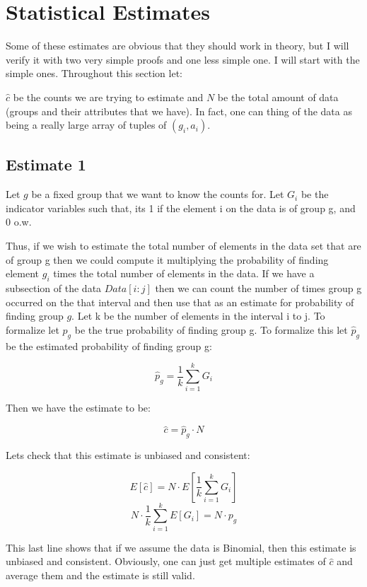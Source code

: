 \documentclass[a4paper]{article}
\begin{document}
\section{Statistical Estimates}

Some of these estimates are obvious that they should work in theory, but I will verify it with two very simple proofs and one less simple one.
I will start with the simple ones.
Throughout this section let:

$\hat{c}$ be the counts we are trying to estimate and $N$ be the total amount of data (groups and their attributes that we have). In fact, one can thing of the data as being a really large array of tuples of $(g_i, a_{i})$.

\subsection{Estimate 1}

Let $g$ be a fixed group that we want to know the counts for.
Let $G_i$ be the indicator variables such that, its 1 if the element i on the data is of group g, and 0 o.w.


Thus, if we wish to estimate the total number of elements in the data set that are of group g then we could compute it multiplying the probability of finding element $g_i$ times the total number of elements in the data. 
If we have a subsection of the data $Data[i:j]$ then we can count the number of times group g occurred on the that interval and then use that as an estimate for probability of finding group $g$.
Let k be the number of elements in the interval i to j.
To formalize let $p_g$ be the true probability of finding group g.
To formalize this let $\hat{p}_g$ be the estimated probability of finding group g:

$$ \hat{p}_g = \frac{1}{k} \sum^{k}_{i=1} G_i $$

Then we have the estimate to be:

$$ \hat{c} = \hat{p}_g \cdot N $$

Lets check that this estimate is unbiased and consistent:

$$E[ \hat{c} ] = N \cdot E[\frac{1}{k} \sum^{k}_{i=1} G_i ]$$
$$N \cdot \frac{1}{k} \sum^{k}_{i=1} E[G_i ] = N \cdot p_g$$

This last line shows that if we assume the data is Binomial, then this estimate is unbiased and consistent.
Obviously, one can just get multiple estimates of $\hat{c}$ and average them and the estimate is still valid.
\end{document}

